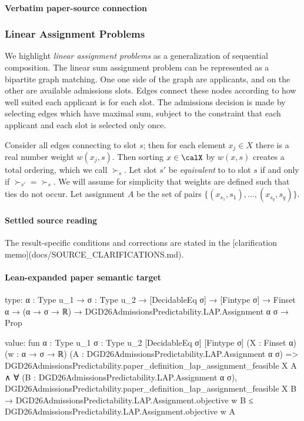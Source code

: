 \documentclass[10pt]{article}
\begin{document}
\paragraph{Verbatim paper-source connection}
\begin{ReviewVerbatim}
\subsubsection{Linear Assignment Problems} \label{sec:lap-proofs}

We highlight \textit{linear assignment problems} as a generalization of sequential composition.
The linear sum assignment problem can be represented as a bipartite graph matching.
One one side of the graph are applicants, and on the other are available admissions slots.
Edges connect these nodes according to how well suited each applicant is for each slot.
The admissions decision is made by selecting edges which have maximal sum, subject to the constraint that each applicant and each slot is selected only once.

Consider all edges connecting to slot $s$; then for each element  $x_j \in X$ there is a real number weight $w(x_j, s)$. Then sorting $x \in \calX$ by $w(x,s)$ creates a total ordering, which we call $\succ_s$. Let slot $s'$ be \textit{equivalent} to
to slot $s$ if and only if $\succ_{s'} = \succ_{s}$.
We will assume for simplicity that weights are defined such that ties do not occur.
Let assignment $A$ be the set of pairs $\{(x_{s_1}, s_1), ..., (x_{s_q}, s_q)\}$.
\end{ReviewVerbatim}

\paragraph{Settled source reading}
The result-\allowbreak{}specific conditions and corrections are stated in the [clarification memo](docs/\allowbreak{}SOURCE\_\allowbreak{}CLARIFICATIONS.\allowbreak{}md).\allowbreak{}

\paragraph{Lean-expanded paper semantic target}
\begin{ReviewVerbatim}
type:
{α : Type u_1} →
  {σ : Type u_2} →
    [DecidableEq σ] → [Fintype σ] → Finset α → (α → σ → ℝ) → DGD26AdmissionsPredictability.LAP.Assignment α σ → Prop

value:
fun {α : Type u_1} {σ : Type u_2} [DecidableEq σ] [Fintype σ] (X : Finset α) (w : α → σ → ℝ)
    (A : DGD26AdmissionsPredictability.LAP.Assignment α σ) =>
  DGD26AdmissionsPredictability.paper_definition_lap_assignment_feasible X A ∧
    ∀ (B : DGD26AdmissionsPredictability.LAP.Assignment α σ),
      DGD26AdmissionsPredictability.paper_definition_lap_assignment_feasible X B →
        DGD26AdmissionsPredictability.LAP.Assignment.objective w B ≤
          DGD26AdmissionsPredictability.LAP.Assignment.objective w A
\end{ReviewVerbatim}
\end{document}

